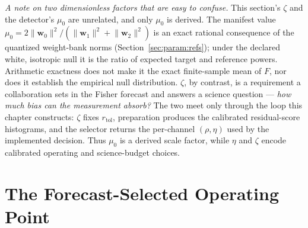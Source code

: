 \textit{A note on two dimensionless factors that are easy to confuse.} This section's $\zeta$ and the detector's $\mu_0$ are unrelated, and only $\mu_0$ is derived.  The manifest value $\mu_0=2\lVert\mathbf w_0\rVert^2/(\lVert\mathbf w_1\rVert^2+\lVert\mathbf w_2\rVert^2)$ is an exact rational consequence of the quantized weight-bank norms (Section~\ref{sec:param:refs}); under the declared white, isotropic null it is the ratio of expected target and reference powers.  Arithmetic exactness does not make it the exact finite-sample mean of $F$, nor does it establish the empirical null distribution.  $\zeta$, by contrast, is a requirement a collaboration sets in the Fisher forecast and answers a science question --- \emph{how much bias can the measurement absorb?} The two meet only through the loop this chapter constructs: $\zeta$ fixes $r_{\text{tol}}$, preparation produces the calibrated residual-score histograms, and the selector returns the per-channel $(\rho,\eta)$ used by the implemented decision. Thus $\mu_0$ is a derived scale factor, while $\eta$ and $\zeta$ encode calibrated operating and science-budget choices.

\section{The Forecast-Selected Operating Point}
\label{sec:tolerance:thresholds}

